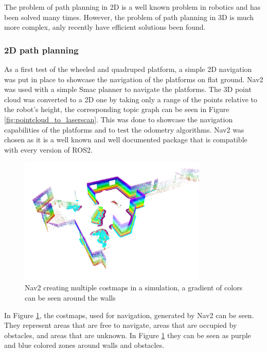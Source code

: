 \documentclass[12pt]{article}
\begin{document}
        The problem of path planning in 2D is a well known problem in robotics and has been solved many times. However, the problem of path planning in 3D is much more complex, anly recently have efficient solutions been found. 

        \subsubsection{2D path planning}
        As a first test of the wheeled and quadruped platform, a simple 2D navigation was put in place to showcase the navigation of the platforms on flat ground. Nav2 \cite{macenski2020marathon2} was used with a simple Smac planner \cite{macenski2024smac} to navigate the platforms. The 3D point cloud was converted to a 2D one by taking only a range of the points relative to the robot's height, the corresponding topic graph can be seen in Figure \ref{fig:pointcloud_to_laserscan}. This was done to showcase the navigation capabilities of the platforms and to test the odometry algorithms. Nav2 was chosen as it is a well known and well documented package that is compatible with every version of ROS2. 
                
        \begin{figure}[H]
            \centering
            \label{fig:nav2_costmaps}
            \includegraphics[width=0.8\textwidth]{Images/nav2_costmaps_alpha.png}
            \caption{Nav2 creating multiple costmaps in a simulation, a gradient of colors can be seen around the walls}
        \end{figure}
        
        In Figure \ref{fig:nav2_costmaps}, the costmaps, used for navigation, generated by Nav2 can be seen. They represent areas that are free to navigate, areas that are occupied by obstacles, and areas that are unknown. In Figure \ref{fig:nav2_costmaps} they can be seen as purple and blue colored zones around walls and obstacles.  
\end{document}
